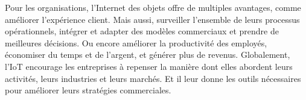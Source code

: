 Pour les organisations, l’Internet des objets offre de multiples avantages, comme améliorer l’expérience client. Mais aussi, surveiller l’ensemble de leurs processus opérationnels, intégrer et adapter des modèles commerciaux et prendre de meilleures décisions. Ou encore améliorer la productivité des employés, économiser du temps et de l’argent, et générer plus de revenus. Globalement, l’IoT encourage les entreprises à repenser la manière dont elles abordent leurs activités, leurs industries et leurs marchés. Et il leur donne les outils nécessaires pour améliorer leurs stratégies commerciales.
